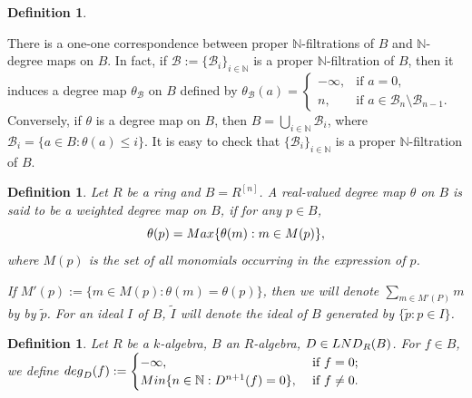 \documentclass[a4paper,12pt]{article}
\newtheorem{defn}[thm]{Definition}
\newcommand{\bN}{\mathbb N}
\newcommand{\lB}{\mathcal{B}}
\begin{document}
{\begin{defn}
\end{defn}
\noindent
There is a one-one correspondence between proper $\bN$-filtrations of $B$ and $\bN$-degree maps on $B$. In fact, if $\lB:=\{\lB_i\}_{i\in\bN}$ is a proper $\bN$-filtration of $B$, then it induces a degree map $\theta_{\lB}$ on $B$ defined by $\theta_\lB(a)=
\begin{cases}
-\infty,& \text{if }a=0,\\
n,& \text{if }a\in{\lB_n\setminus\lB_{n-1}}.
\end{cases}
$ \\Conversely, if $\theta$ is a degree map on $B$, then $B=\underset{i\in\bN}\bigcup \lB_i$, where $\lB_i=\{a\in B:\theta(a)\leqslant i\}$. It is easy to check that $\{\lB_i\}_{i\in\bN}$ is a proper $\bN$-filtration of $B$.

\begin{defn}
\emph {Let $R$ be a ring and $B=R^{[n]}$. A real-valued degree map $\theta$ on $B$ is said to be a {\it weighted degree map} on $B$, if for any $p\in B$, $$\theta(p)={\rm Max}\{\theta(m):m\in M(p)\},$$ where $M(p)$ is the set of all monomials occurring in the expression of $p$.
}

\smallskip\noindent
\emph{If $M'(p):=\{m\in M(p):\theta(m)=\theta(p)\}$, 
	then we will denote $\sum \limits_{m\in{M'(P)}} m$ by by $\widetilde{p}$. For an ideal $I$ of $B$, $\widetilde{I}$ will denote the ideal of $B$ generated by $\{\widetilde{p}:p\in I\}$.
}
\end{defn}

\begin{defn}
\emph{Let $R$ be a $k$-algebra, $B$ an $R$-algebra, $D\in{\rm LND}_{R}(B)$. For $f\in B$, we define  ${\rm deg}_D(f):=\begin{cases}
-\infty, & \text{ if }f=0;\\
   {\rm Min}\{n\in \bN:D^{n+1}(f)=0\}, & \text{ if }f\neq 0. 
\end{cases}
$}
\end{defn}

}
\end{document}
